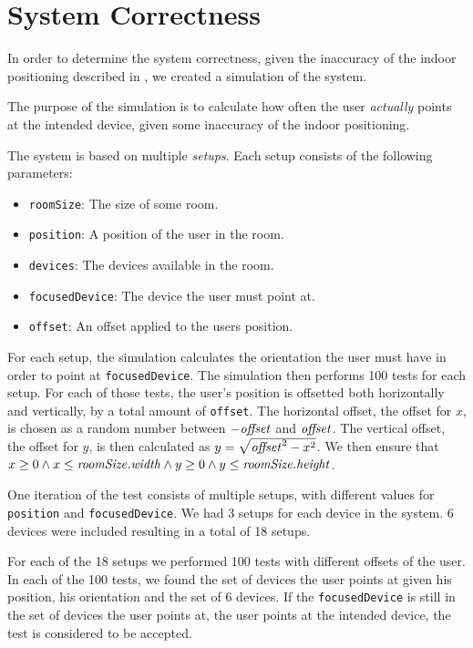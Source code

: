 \section{System Correctness}
\label{sec:evaluation:system-correctness}

In order to determine the system correctness, 
given the inaccuracy of the indoor positioning described in , 
we created a simulation of the system.

The purpose of the simulation is to calculate how often the user \emph{actually} points at the intended device, 
given some inaccuracy of the indoor positioning.

The system is based on multiple \textit{setups}. 
Each setup consists of the following parameters:
\begin{itemize}
\item \texttt{roomSize}: The size of some room.
\item \texttt{position}: A position of the user in the room.
\item \texttt{devices}: The devices available in the room.
\item \texttt{focusedDevice}: The device the user must point at.
\item \texttt{offset}: An offset applied to the users position.
\end{itemize}

For each setup, the simulation calculates the orientation the user must have in order to point at \texttt{focusedDevice}. 
The simulation then performs \num{100} tests for each setup. 
For each of those tests, 
the user's position is offsetted both horizontally and vertically, 
by a total amount of \texttt{offset}. 
The horizontal offset, \ie the offset for $x$, 
is chosen as a random number between $-\var{offset}$ and $\var{offset}$. 
The vertical offset, \ie the offset for $y$, 
is then calculated as $y = \sqrt{\var{offset}^2 - x^2}$. 
We then ensure that $x \geq 0 \wedge x \leq \var{roomSize.width} \wedge y \geq 0 \wedge y \leq \var{roomSize.height}$.

One iteration of the test consists of multiple setups, 
with different values for \texttt{position} and \texttt{focusedDevice}. 
We had \num{3} setups for each device in the system. 
\num{6} devices were included resulting in a total of \num{18} setups.

For each of the \num{18} setups we performed \num{100} tests with different offsets of the user. 
In each of the \num{100} tests, 
we found the set of devices the user points at given his position, 
his orientation and the set of \num{6} devices. 
If the \texttt{focusedDevice} is still in the set of devices the user points at, 
\ie the user points at the intended device,
the test is considered to be accepted. 

